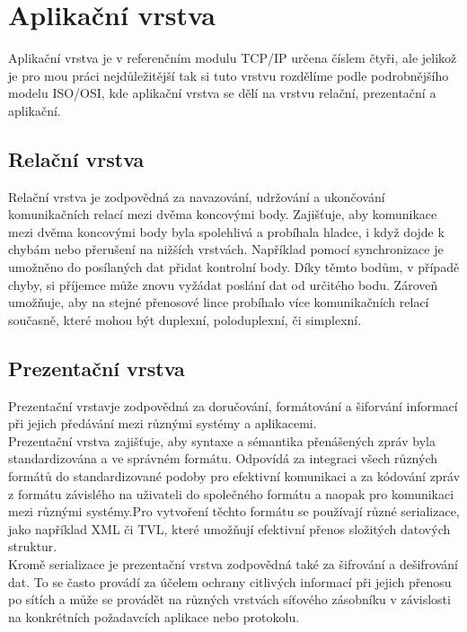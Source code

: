 \documentclass[12pt]{report}			%
\begin{document}
			\section{Aplikační  vrstva}
 Aplikační vrstva je v referenčním modulu TCP/IP určena číslem čtyři, ale jelikož je pro mou práci nejdůležitější tak si tuto vrstvu rozdělíme podle podrobnějšího modelu ISO/OSI, kde aplikační vrstva se dělí na vrstvu relační, prezentační a aplikační. 
 
 
				\subsection{Relační vrstva}
Relační vrstva je zodpovědná za navazování, udržování a ukončování komunikačních relací mezi dvěma koncovými body. Zajišťuje, aby komunikace mezi dvěma koncovými body byla spolehlivá a probíhala hladce, i když dojde k chybám nebo přerušení na nižších vrstvách. Například pomocí synchronizace je umožněno do posílaných dat přidat kontrolní body. Díky těmto bodům, v případě chyby, si příjemce může znovu vyžádat poslání dat od určitého bodu. Zároveň umožňuje, aby na stejné přenosové lince probíhalo více komunikačních relací současně, které mohou být duplexní, poloduplexní, či simplexní. \cite{session1}\cite{session2}


				\subsection{Prezentační vrstva}
Prezentační vrstavje zodpovědná za doručování, formátování a šiforvání informací při jejich předávání mezi různými systémy a aplikacemi.
\\
Prezentační vrstva zajišťuje, aby syntaxe a sémantika přenášených zpráv byla standardizována a ve správném formátu. Odpovídá za integraci všech různých formátů do standardizované podoby pro efektivní komunikaci a za kódování zpráv z formátu závislého na uživateli do společného formátu a naopak pro komunikaci mezi různými systémy.Pro vytvoření těchto formátu se používají různé serializace, jako například XML či TVL, které umožňují efektivní přenos složitých datových struktur. 
\\
Kromě serializace je prezentační vrstva zodpovědná také za šifrování a dešifrování dat. To se často provádí za účelem ochrany citlivých informací při jejich přenosu po sítích a může se provádět na různých vrstvách síťového zásobníku v závislosti na konkrétních požadavcích aplikace nebo protokolu.\cite{presentation1}\cite{presentation2}\cite{presentation3}
\end{document}
